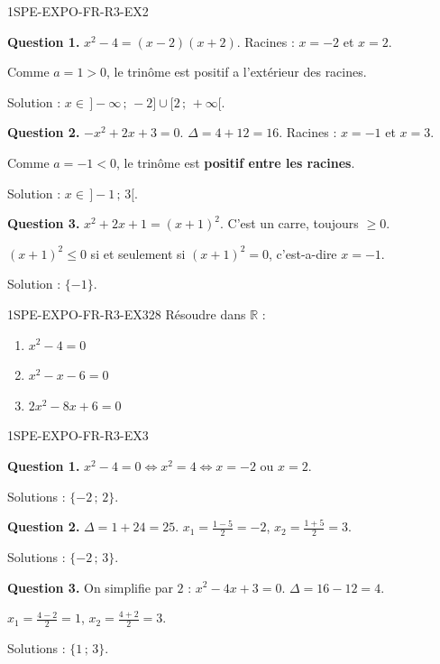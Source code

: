 \begin{corrige}{1SPE-EXPO-FR-R3-EX2}

\textbf{Question 1.} $x^2 - 4 = (x-2)(x+2)$. Racines : $x = -2$ et $x = 2$.

Comme $a = 1 > 0$, le trinôme est positif a l'extérieur des racines.

Solution : $x \in \,]-\infty\,;\,-2] \cup [2\,;\,+\infty[$.

\textbf{Question 2.} $-x^2 + 2x + 3 = 0$. $\Delta = 4 + 12 = 16$. Racines : $x = -1$ et $x = 3$.

Comme $a = -1 < 0$, le trinôme est \textbf{positif entre les racines}.


Solution : $x \in \,]-1\,;\,3[$.

\textbf{Question 3.} $x^2 + 2x + 1 = (x+1)^2$. C'est un carre, toujours $\geqslant 0$.

$(x+1)^2 \leqslant 0$ si et seulement si $(x+1)^2 = 0$, c'est-a-dire $x = -1$.

Solution : $\{-1\}$.

\end{corrige}


\begin{exercice}{1SPE-EXPO-FR-R3-EX3}{2}{8}
Résoudre dans $\mathbb{R}$ :
\begin{enumerate}
  \item $x^2 - 4 = 0$
  \item $x^2 - x - 6 = 0$
  \item $2x^2 - 8x + 6 = 0$
\end{enumerate}
\end{exercice}



\begin{corrige}{1SPE-EXPO-FR-R3-EX3}

\textbf{Question 1.} $x^2 - 4 = 0 \Leftrightarrow x^2 = 4 \Leftrightarrow x = -2$ ou $x = 2$.

Solutions : $\{-2\,;\,2\}$.

\textbf{Question 2.} $\Delta = 1 + 24 = 25$. $x_1 = \frac{1-5}{2} = -2$, $x_2 = \frac{1+5}{2} = 3$.

Solutions : $\{-2\,;\,3\}$.

\textbf{Question 3.} On simplifie par $2$ : $x^2 - 4x + 3 = 0$. $\Delta = 16 - 12 = 4$.

$x_1 = \frac{4-2}{2} = 1$, $x_2 = \frac{4+2}{2} = 3$.

Solutions : $\{1\,;\,3\}$.

\end{corrige}
